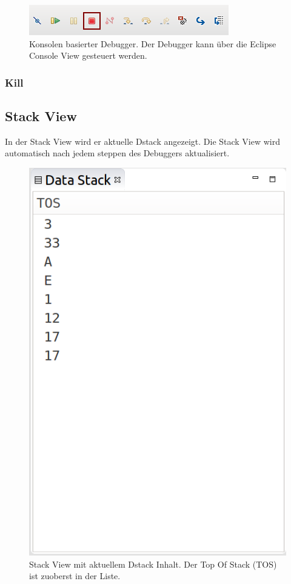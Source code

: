 \begin{figure}[H]
	\centering
		\includegraphics[scale=1]{debugger/terminate.png}
		\caption{Konsolen basierter Debugger. Der Debugger kann über die Eclipse Console View gesteuert werden.}
		\label{fig:extensionpoint}
\end{figure}

\subsubsection{Kill}

\subsection{Stack View}

In der Stack View wird er aktuelle Dstack angezeigt. Die Stack View wird automatisch nach jedem steppen des Debuggers aktualisiert.

\begin{figure}[H]
	\centering
		\includegraphics[scale=0.35]{debugger/stack.png}
		\caption{Stack View mit aktuellem Dstack Inhalt. Der Top Of Stack (TOS) ist zuoberst in der Liste.}
		\label{fig:extensionpoint}
\end{figure}


